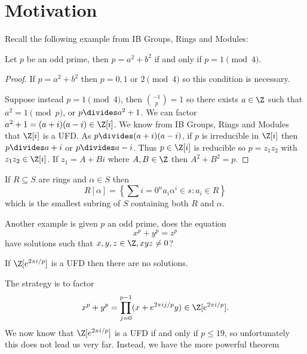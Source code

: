 \documentclass[a4paper]{article}
\begin{document}


\tableofcontents

\setcounter{section}{-1}

\section{Motivation}

Recall the following example from IB Groups, Rings and Modules:

\begin{theorem}
  Let \(p\) be an odd prime, then \(p = a^2 + b^2\) if and only if \(p = 1 \pmod 4\).
\end{theorem}

\begin{proof}
  If \(p = a^2 + b^2\) then \(p = 0, 1 \text{ or } 2 \pmod 4\) so this condition is necessary.

  Suppose instead \(p = 1 \pmod 4\), then \(\binom{-1}{p} = 1\) so there exists \(a \in \Z\) such that \(a^2 = 1 \pmod p\), or \(p \divides a^2 + 1\). We can factor \(a^2 + 1 = (a + i)(a - i) \in \Z[i]\). We know from IB Groups, Rings and Modules that \(\Z[i]\) is a UFD. As \(p \divides (a + i)(a - i)\), if \(p\) is irreducible in \(\Z[i]\)  then \(p \divides a + i\) or \(p \divides a - i\). Thus \(p \in \Z[i]\) is reducible so \(p = z_1z_2\) with \(z_1z_2 \in \Z[i]\). If \(z_1 = A + Bi\) where \(A, B \in \Z\) then \(A^2 + B^2 = p\).
\end{proof}

\begin{notation}
  If \(R \subseteq S\) are rings and \(\alpha \in S\) then
  \[
    R[\alpha] = \left\{ \sum{i = 0}^n a_i\alpha^i \in s: a_i \in R \right\}
  \]
  which is the smallest subring of \(S\) containing both \(R\) and \(\alpha\).
\end{notation}

Another example is given \(p\) an odd prime, does the equation
\[
  x^p + y^p = z^p
\]
have solutions such that \(x, y, z \in \Z, xyz \neq 0\)?

\begin{theorem}[Kummer, 1850]
  If \(\Z[e^{2\pi i/p}]\) is a UFD then there are no solutions.
\end{theorem}

The strategy is to factor
\[
  x^p + y^p = \prod_{j = 0}^{p - 1} (x + e^{2\pi ij/p}y) \in \Z[e^{2\pi i/p}].
\]
We now know that \(\Z[e^{2\pi i/p}]\) is a UFD if and only if \(p \leq 19\), so unfortunately this does not lead us very far. Instead, we have the more powerful theorem
\end{document}
